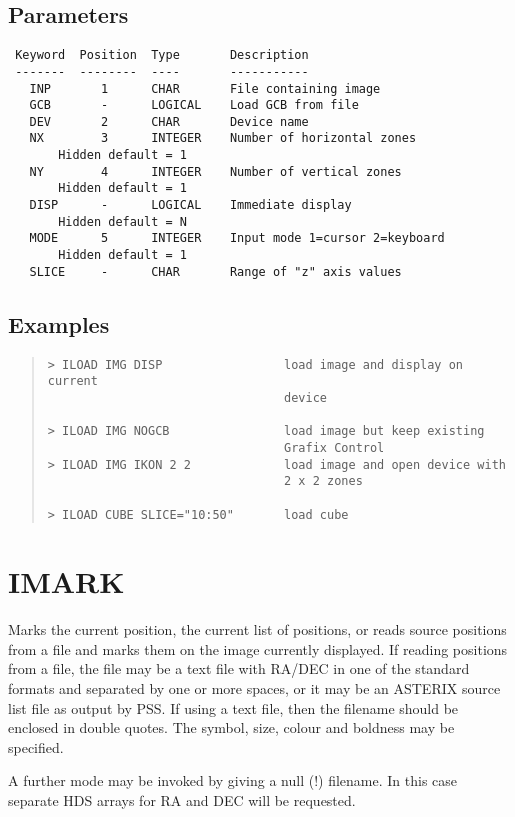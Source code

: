 \documentclass{book}
\renewcommand{\_}{{\tt\char'137}}     %
\begin{document}
\subsection{Parameters}
\begin{verbatim}
 Keyword  Position  Type       Description
 -------  --------  ----       -----------
   INP       1      CHAR       File containing image
   GCB       -      LOGICAL    Load GCB from file
   DEV       2      CHAR       Device name
   NX        3      INTEGER    Number of horizontal zones
       Hidden default = 1
   NY        4      INTEGER    Number of vertical zones
       Hidden default = 1
   DISP      -      LOGICAL    Immediate display
       Hidden default = N
   MODE      5      INTEGER    Input mode 1=cursor 2=keyboard
       Hidden default = 1
   SLICE     -      CHAR       Range of "z" axis values
\end{verbatim}\subsection{Examples}
\begin{quote}\begin{verbatim}
> ILOAD IMG DISP                 load image and display on current
                                 device

> ILOAD IMG NOGCB                load image but keep existing
                                 Grafix Control
> ILOAD IMG IKON 2 2             load image and open device with
                                 2 x 2 zones

> ILOAD CUBE SLICE="10:50"       load cube
 \end{verbatim}\end{quote}
\section{IMARK}
Marks the current position, the current list of positions, or reads
source positions from a file and marks them on the image currently
displayed. If reading positions from a file, the file may be a text
file with RA/DEC in one of the standard formats and separated by one or
more spaces, or it may be an ASTERIX source list file as output by PSS.
If using a text file, then the filename should be enclosed in double
quotes. The symbol, size, colour and boldness may be specified.

A further mode may be invoked by giving a null (!) filename.
In this case separate HDS arrays for RA and DEC will be requested.
\end{document}
